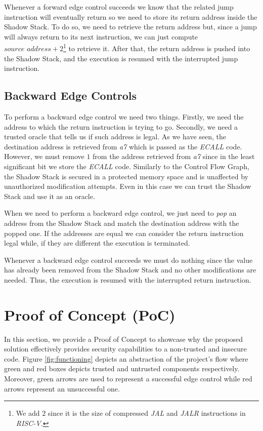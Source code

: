 Whenever a forward edge control succeeds we know that the related jump
instruction will eventually return so we need to store its return address inside
the Shadow Stack. To do so, we need to retrieve the return address but, since a jump
will always return to its next instruction, we can just compute
$\textit{source address}+ 2$\footnote{We add $2$ since it is the size of
compressed \textit{JAL} and \textit{JALR} instructions in \textit{RISC-V}.} to retrieve
it. After that, the return address is pushed into the Shadow Stack, and the
execution is resumed with the interrupted jump instruction.

\subsection{Backward Edge Controls}
\label{subsec:backward}

To perform a backward edge control we need two things. Firstly, we need the address
to which the return instruction is trying to go. Secondly, we need a trusted oracle
that tells us if such address is legal. As we have seen, the destination address
is retrieved from \textit{a7} which is passed as the \textit{ECALL} code.
However, we must remove $1$ from the address retrieved from \textit{a7} since in
the least significant bit we store the \textit{ECALL} code. Similarly to the
Control Flow Graph, the Shadow Stack is secured in a protected memory space and is
unaffected by unauthorized modification attempts. Even in this case we can trust
the Shadow Stack and use it as an oracle.

When we need to perform a backward edge control, we just need to \textit{pop} an
address from the Shadow Stack and match the destination address with the popped
one. If the addresses are equal we can consider the return instruction legal while,
if they are different the execution is terminated.

Whenever a backward edge control succeeds we must do nothing since the value has
already been removed from the Shadow Stack and no other modifications are needed.
Thus, the execution is resumed with the interrupted return instruction.

\section{Proof of Concept (PoC)}
\label{sec:project_poc}

In this section, we provide a Proof of Concept to showcase why the proposed
solution effectively provides security capabilities to a non-trusted and
insecure code. Figure \ref{fig:functioning} depicts an abstraction of the project's
flow where green and red boxes depicts trusted and untrusted components respectively.
Moreover, green arrows are used to represent a successful edge control while red
arrows represent an unsuccessful one.

